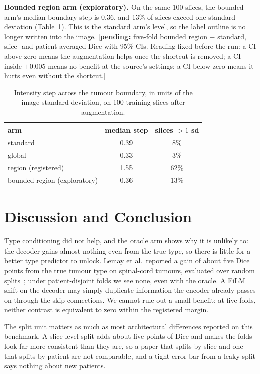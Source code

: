 \documentclass[runningheads]{llncs}
\newcommand{\pending}[1]{\textcolor{red!70!black}{[\textbf{pending:} #1]}}
\begin{document}
\noindent\textbf{Bounded region arm (exploratory).}
On the same 100 slices, the bounded arm's median boundary step is 0.36, and 13\%
of slices exceed one standard deviation (Table~\ref{tab:step}). This is the
standard arm's level, so the label outline is no longer written into the image.
\pending{five-fold bounded region $-$ standard, slice- and patient-averaged Dice
with 95\% CIs. Reading fixed before the run: a CI above zero means the
augmentation helps once the shortcut is removed; a CI inside $\pm0.005$ means no
benefit at the source's settings; a CI below zero means it hurts even without
the shortcut.}

\begin{table}[t]
\centering
\caption{Intensity step across the tumour boundary, in units of the image
standard deviation, on 100 training slices after augmentation.}
\label{tab:step}
\begin{tabular}{@{}lcc@{}}
\toprule
arm & median step & slices $>1$ sd\\
\midrule
standard & 0.39 & 8\%\\
global & 0.33 & 3\%\\
region (registered) & 1.55 & 62\%\\
bounded region (exploratory) & 0.36 & 13\%\\
\bottomrule
\end{tabular}
\end{table}

\section{Discussion and Conclusion}
Type conditioning did not help, and the oracle arm shows why it is unlikely
to: the decoder gains almost nothing even from the true type, so there is little
for a better type predictor to unlock. Lemay et al.\ reported a gain of about five Dice points from the true tumour type on spinal-cord tumours, evaluated over random splits~\cite{lemay2021}; under patient-disjoint folds we see none, even with the oracle. A FiLM shift on the decoder may simply
duplicate information the encoder already passes on through the skip
connections. We cannot rule out a small benefit; at five folds, neither
contrast is equivalent to zero within the registered margin.

The split unit matters as much as most architectural differences reported on
this benchmark. A slice-level split adds about five points of Dice and makes the
folds look far more consistent than they are, so a paper that splits by slice
and one that splits by patient are not comparable, and a tight error bar from a
leaky split says nothing about new patients.
\end{document}
